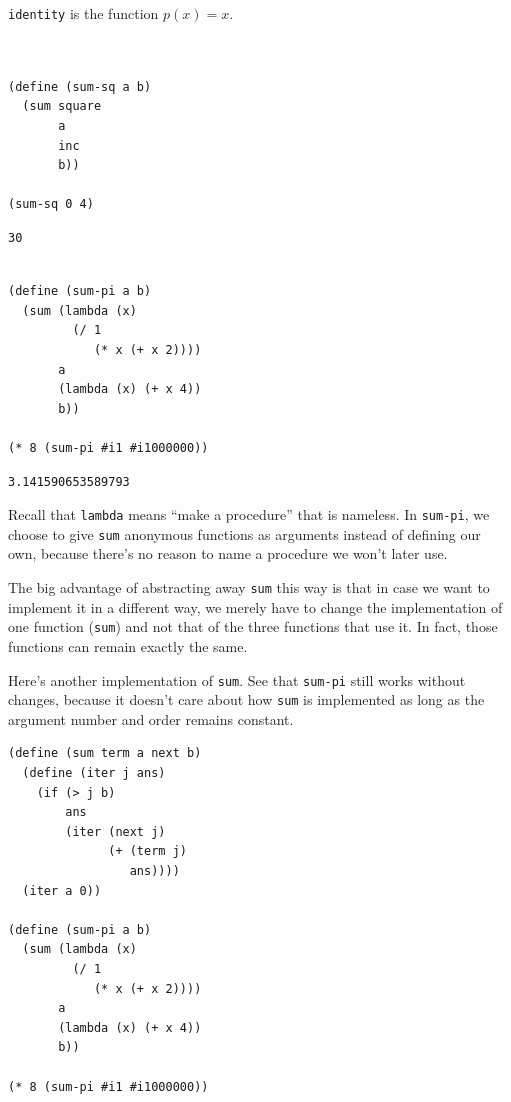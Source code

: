 \documentclass[9pt]{report}
\begin{document}
\texttt{identity} is the function \(p(x) = x\).

\begin{verbatim}


(define (sum-sq a b)
  (sum square
       a
       inc
       b))

(sum-sq 0 4)
\end{verbatim}

\begin{verbatim}
30
\end{verbatim}


\begin{verbatim}

(define (sum-pi a b)
  (sum (lambda (x)
         (/ 1
            (* x (+ x 2))))
       a
       (lambda (x) (+ x 4))
       b))

(* 8 (sum-pi #i1 #i1000000))
\end{verbatim}

\begin{verbatim}
3.141590653589793
\end{verbatim}


Recall that \texttt{lambda} means ``make a procedure'' that is nameless. In
\texttt{sum-pi}, we choose to give \texttt{sum} anonymous functions as arguments
instead of defining our own, because there's no reason to name a
procedure we won't later use.

The big advantage of abstracting away \texttt{sum} this way is that in
case we want to implement it in a different way, we merely have to
change the implementation of one function (\texttt{sum}) and not that of
the three functions that use it. In fact, those functions can
remain exactly the same.

Here's another implementation of \texttt{sum}. See that \texttt{sum-pi} still
works without changes, because it doesn't care about how \texttt{sum} is
implemented as long as the argument number and order remains
constant.

\begin{verbatim}
(define (sum term a next b)
  (define (iter j ans)
    (if (> j b)
        ans
        (iter (next j)
              (+ (term j)
                 ans))))
  (iter a 0))

(define (sum-pi a b)
  (sum (lambda (x)
         (/ 1
            (* x (+ x 2))))
       a
       (lambda (x) (+ x 4))
       b))

(* 8 (sum-pi #i1 #i1000000))
\end{verbatim}
\end{document}
